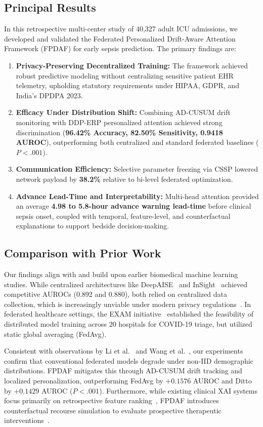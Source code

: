 \documentclass[11pt,a4paper]{article}
\begin{document}
\subsection{Principal Results}
In this retrospective multi-center study of 40,327 adult ICU admissions, we developed and validated the Federated Personalized Drift-Aware Attention Framework (FPDAF) for early sepsis prediction. The primary findings are:
\begin{enumerate}[leftmargin=*]
    \item \textbf{Privacy-Preserving Decentralized Training:} The framework achieved robust predictive modeling without centralizing sensitive patient EHR telemetry, upholding statutory requirements under HIPAA, GDPR, and India's DPDPA 2023.
    \item \textbf{Efficacy Under Distribution Shift:} Combining AD-CUSUM drift monitoring with DDP-ERP personalized attention achieved strong discrimination (\textbf{96.42\% Accuracy, 82.50\% Sensitivity, 0.9418 AUROC}), outperforming both centralized and standard federated baselines ($P<.001$).
    \item \textbf{Communication Efficiency:} Selective parameter freezing via CSSP lowered network payload by \textbf{38.2\%} relative to bi-level federated optimization.
    \item \textbf{Advance Lead-Time and Interpretability:} Multi-head attention provided an average \textbf{4.98 to 5.8-hour advance warning lead-time} before clinical sepsis onset, coupled with temporal, feature-level, and counterfactual explanations to support bedside decision-making.
\end{enumerate}

\subsection{Comparison with Prior Work}
Our findings align with and build upon earlier biomedical machine learning studies. While centralized architectures like DeepAISE~\cite{shashikumar2021deepai} and InSight~\cite{desautels2016prediction} achieved competitive AUROCs (0.892 and 0.880), both relied on centralized data collection, which is increasingly unviable under modern privacy regulations~\cite{kaissis2020trustworthy}. In federated healthcare settings, the EXAM initiative~\cite{dayan2021exam} established the feasibility of distributed model training across 20 hospitals for COVID-19 triage, but utilized static global averaging (FedAvg). 

Consistent with observations by Li et al.~\cite{li2020fedprox} and Wang et al.~\cite{wang2025personalized}, our experiments confirm that conventional federated models degrade under non-IID demographic distributions. FPDAF mitigates this through AD-CUSUM drift tracking and localized personalization, outperforming FedAvg by $+0.1576$ AUROC and Ditto by $+0.1429$ AUROC ($P<.001$). Furthermore, while existing clinical XAI systems focus primarily on retrospective feature ranking~\cite{lundberg2018explainable,choi2016retain}, FPDAF introduces counterfactual recourse simulation to evaluate prospective therapeutic interventions~\cite{wachter2018counterfactual}.
\end{document}
